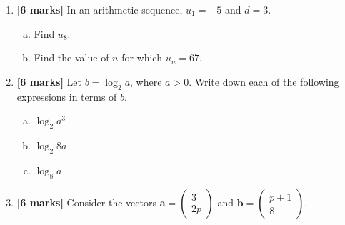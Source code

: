 \documentclass[12pt, twoside]{article}
\begin{document}
\begin{enumerate}
\begin{center}
\begin{tabular}{|c|c|c|c|c|}
\hline
$x$ & $-2$ & $1$ & $3$ & $6$ \\
\hline
$f(x)$ & $6$ & $3$ & $1$ & $-2$ \\
\hline
$g(x)$ & $-7$ & $-2$ & $5$ & $9$ \\
\hline
\end{tabular}
\end{center}

\begin{enumerate}[(a)]
    \item Write down the value of $f(1)$.
    \item Find the value of $(g \circ f)(1)$.
    \item Find the value of $g^{-1}(-2)$.
\end{enumerate}

\vspace{1cm}

\item \textbf{[6 marks]} In an arithmetic sequence, $u_1 = -5$ and $d = 3$.

\begin{enumerate}[(a)]
    \item Find $u_8$.
    \item Find the value of $n$ for which $u_n = 67$.
\end{enumerate}

\vspace{1cm}

\item \textbf{[6 marks]} Let $b = \log_2 a$, where $a > 0$. Write down each of the following expressions in terms of $b$.

\begin{enumerate}[(a)]
    \item $\log_2 a^3$
    \item $\log_2 8a$
    \item $\log_8 a$
\end{enumerate}

\vspace{1cm}

\item \textbf{[6 marks]} Consider the vectors $\mathbf{a} = \begin{pmatrix} 3 \\ 2p \end{pmatrix}$ and $\mathbf{b} = \begin{pmatrix} p+1 \\ 8 \end{pmatrix}$.


\end{enumerate}
\end{document}
